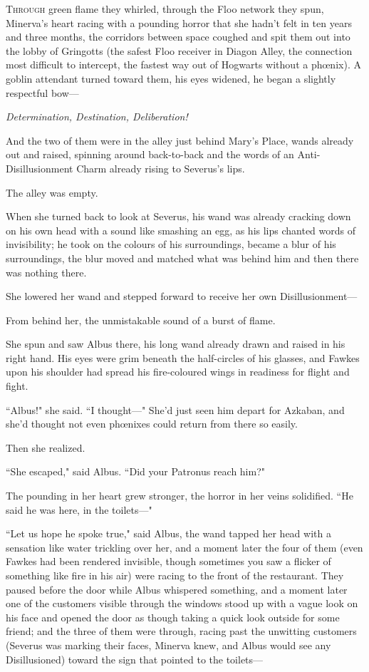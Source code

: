 
\lettrine{T}{hrough} green flame they whirled, through the Floo network they spun, Minerva's heart racing with a pounding horror that she hadn't felt in ten years and three months, the corridors between space coughed and spit them out into the lobby of Gringotts (the safest Floo receiver in Diagon Alley, the connection most difficult to intercept, the fastest way out of Hogwarts without a phœnix). A goblin attendant turned toward them, his eyes widened, he began a slightly respectful bow—

\emph{Determination, Destination, Deliberation!}

And the two of them were in the alley just behind Mary's Place, wands already out and raised, spinning around back-to-back and the words of an Anti-Disillusionment Charm already rising to Severus's lips.

The alley was empty.

When she turned back to look at Severus, his wand was already cracking down on his own head with a sound like smashing an egg, as his lips chanted words of invisibility; he took on the colours of his surroundings, became a blur of his surroundings, the blur moved and matched what was behind him and then there was nothing there.

She lowered her wand and stepped forward to receive her own Disillusionment—

From behind her, the unmistakable sound of a burst of flame.

She spun and saw Albus there, his long wand already drawn and raised in his right hand. His eyes were grim beneath the half-circles of his glasses, and Fawkes upon his shoulder had spread his fire-coloured wings in readiness for flight and fight.

``Albus!" she said. ``I thought—" She'd just seen him depart for Azkaban, and she'd thought not even phœnixes could return from there so easily.

Then she realized.

``She escaped," said Albus. ``Did your Patronus reach him?"

The pounding in her heart grew stronger, the horror in her veins solidified. ``He said he was here, in the toilets—"

``Let us hope he spoke true," said Albus, the wand tapped her head with a sensation like water trickling over her, and a moment later the four of them (even Fawkes had been rendered invisible, though sometimes you saw a flicker of something like fire in his air) were racing to the front of the restaurant. They paused before the door while Albus whispered something, and a moment later one of the customers visible through the windows stood up with a vague look on his face and opened the door as though taking a quick look outside for some friend; and the three of them were through, racing past the unwitting customers (Severus was marking their faces, Minerva knew, and Albus would see any Disillusioned) toward the sign that pointed to the toilets—

